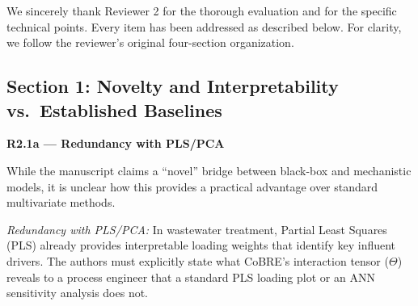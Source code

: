 \documentclass[a4paper,11pt]{article}
\newcommand{\reviewlabel}[1]{\noindent\textbf{\textcolor{accentblue}{#1}}\par\medskip}
\begin{document}
We sincerely thank Reviewer 2 for the thorough evaluation and for the specific technical points. Every item has been addressed as described below. For clarity, we follow the reviewer's original four-section organization.

\subsection*{Section 1: Novelty and Interpretability vs.\ Established Baselines}

\reviewlabel{R2.1a --- Redundancy with PLS/PCA}
\begin{reviewbox}
While the manuscript claims a ``novel'' bridge between black-box and mechanistic models, it is unclear how this provides a practical advantage over standard multivariate methods.

\medskip\noindent\textit{Redundancy with PLS/PCA:} In wastewater treatment, Partial Least Squares (PLS) already provides interpretable loading weights that identify key influent drivers. The authors must explicitly state what CoBRE's interaction tensor ($\Theta$) reveals to a process engineer that a standard PLS loading plot or an ANN sensitivity analysis does not.
\end{reviewbox}
\end{document}
